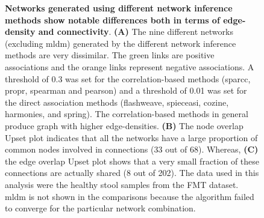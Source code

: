  \begin{figure}[H]
    \centering
    \caption{
      \textbf{Networks generated using different network inference methods show notable differences both in terms of edge-density and connectivity}.
      \textbf{(A)} The nine different networks (excluding \ac{mldm}) generated by the different network inference methods are very dissimilar.
      The green links are positive associations and the orange links represent negative associations.
      A threshold of 0.3 was set for the correlation-based methods (sparcc, propr, spearman and pearson) and a threshold of 0.01 was set for the direct association methods (flashweave, spieceasi, cozine, harmonies, and spring).
      The correlation-based methods in general produce graph with higher edge-densities.
      \textbf{(B)} The node overlap Upset plot indicates that all the networks have a large proportion of common nodes involved in connections (33 out of 68).
      Whereas, \textbf{(C)} the edge overlap Upset plot shows that a very small fraction of these connections are actually shared (8 out of 202).
      The data used in this analysis were the healthy stool samples from the FMT dataset.
      \ac{mldm} is not shown in the comparisons because the algorithm failed to converge for the particular network combination.
    }
    \label{fig:figure4}
  \end{figure}


